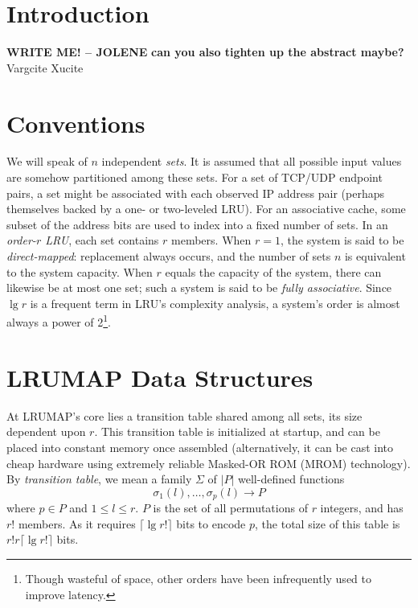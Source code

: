 \documentclass[10pt]{sigplanconf}
\begin{document}
\section{Introduction}
\textbf{WRITE ME! -- JOLENE}
\textbf{can you also tighten up the abstract maybe?}
Vargcite\citep{varghese}
Xucite\citep{xu}

\section{Conventions}
We will speak of $n$ independent \textit{sets}. It is assumed that all possible
input values are somehow partitioned among these sets. For a set of TCP/UDP
endpoint pairs, a set might be associated with each observed IP address pair
(perhaps themselves backed by a one- or two-leveled LRU). For an associative
cache, some subset of the address bits are used to index into a fixed number of
sets. In an \textit{order-$r$ LRU}, each set contains $r$ members. When $r=1$,
the system is said to be \textit{direct-mapped}: replacement always occurs, and
the number of sets $n$ is equivalent to the system capacity. When $r$ equals
the capacity of the system, there can likewise be at most one set; such a system
is said to be \textit{fully associative}. Since $\lg{r}$ is a frequent term in
LRU's complexity analysis, a system's order is almost always a power of 2\footnote{Though
wasteful of space, other orders have been infrequently used to improve latency\citep{intelcpuid}.}.
\section{LRUMAP Data Structures}
At LRUMAP's core lies a transition table shared among all sets, its size
dependent upon $r$. This transition table is initialized at startup, and can be
placed into constant memory once assembled (alternatively, it can be cast into
cheap hardware using extremely reliable Masked-OR ROM (MROM)
technology\citep{ice}). By \textit{transition table}, we mean a family $\Sigma$ of $|P|$
well-defined functions \begin{equation*}
\sigma_{1}(l),\dotsc,\sigma_{p}(l)\longrightarrow{P}
\end{equation*} where $p\in{P}$ and $1\le{l}\le{r}$. $P$ is the set of all
permutations of $r$ integers, and has $r!$ members. As it requires $\lceil\lg{r!}\rceil$
bits to encode $p$, the total size of this table is $r!r\lceil\lg{r!}\rceil$ bits.
\end{document}
